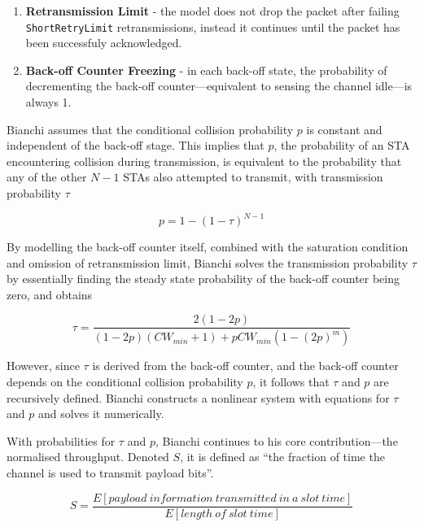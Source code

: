 \begin{enumerate}

	\item \textbf{Retransmission Limit} - the model does not drop the packet
after failing \texttt{ShortRetryLimit} retransmissions, instead it continues
until the packet has been successfuly acknowledged.

	\item \textbf{Back-off Counter Freezing} - in each back-off state, the
probability of decrementing the back-off counter—equivalent to sensing the
channel idle—is always 1.

\end{enumerate}

Bianchi assumes that the conditional collision probability $p$ is constant and
independent of the back-off stage. This implies that $p$, the probability of
an STA encountering collision during transmission, is equivalent to the
probability that any of the other $N-1$ STAs also attempted to transmit, with
transmission probability $\tau$

\begin{equation} \label{eq:pbi}
	p = 1 - (1 - \tau)^{N-1}
\end{equation}

By modelling the back-off counter itself, combined with the saturation
condition and omission of retransmission limit, Bianchi solves the
transmission probability $\tau$ by essentially finding the steady state
probability of the back-off counter being zero, and obtains

\begin{equation} \label{eq:xbi}
	\tau = \frac{2(1-2p)}{(1-2p)(\mathit{CW_{min}}+1)+p\mathit{CW_{min}}(1-(2p)^m)}
\end{equation}

However, since $\tau$ is derived from the back-off counter, and the back-off
counter depends on the conditional collision probability $p$, it follows that
$\tau$ and $p$ are recursively defined. Bianchi constructs a nonlinear system
with equations for $\tau$ and $p$ and solves it numerically.

With probabilities for $\tau$ and $p$, Bianchi continues to his core
contribution—the normalised throughput. Denoted $S$, it is defined as ``the
fraction of time the channel is used to transmit payload bits''. 

\begin{equation} \label{eq:ssbi}
	S = \frac{E[\mathit{payload~information~transmitted~in~a~slot~time}]}{E[\mathit{length~of~slot~time}]}
\end{equation}

